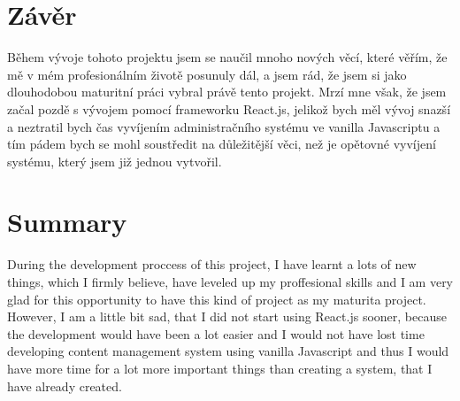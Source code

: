 \documentclass[12pt,a4paper]{report}
\begin{document}
  \clearpage
  \section*{Závěr}
  Během vývoje tohoto projektu jsem se naučil mnoho nových věcí, které věřím, že mě v mém
  profesionálním životě posunuly dál, a jsem rád, že jsem si jako dlouhodobou maturitní práci
  vybral právě tento projekt. Mrzí mne však, že jsem začal pozdě s vývojem pomocí frameworku
  React.js, jelikož bych měl vývoj snazší a neztratil bych čas vyvíjením administračního systému ve
  vanilla Javascriptu a tím pádem bych se mohl soustředit na důležitější věci, než je opětovné
  vyvíjení systému, který jsem již jednou vytvořil.
  \section*{Summary}
  During the development proccess of this project, I have learnt a lots of new things,
  which I firmly believe, have leveled up my proffesional skills  and I am very glad for this opportunity to have
  this kind of project as my maturita project. However, I am a little bit sad, that I did not start
  using React.js sooner, because the development would have been a lot easier and I would not have lost time 
  developing content management system using vanilla Javascript and thus I would have more time for a lot more important 
  things than creating a system, that I have already created.
\end{document}
